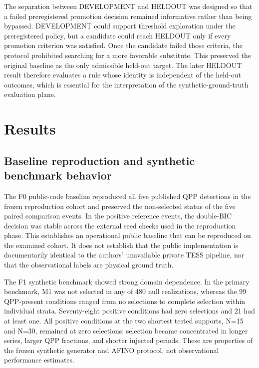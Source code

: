 \documentclass[11pt,a4paper]{article}
\begin{document}
The separation between DEVELOPMENT and HELDOUT was designed so that a failed preregistered promotion decision remained informative rather than being bypassed. DEVELOPMENT could support threshold exploration under the preregistered policy, but a candidate could reach HELDOUT only if every promotion criterion was satisfied. Once the candidate failed those criteria, the protocol prohibited searching for a more favorable substitute. This preserved the original baseline as the only admissible held-out target. The later HELDOUT result therefore evaluates a rule whose identity is independent of the held-out outcomes, which is essential for the interpretation of the synthetic-ground-truth evaluation plane.

\section{Results}
\subsection{Baseline reproduction and synthetic benchmark behavior}
The F0 public-code baseline reproduced all five published QPP detections in the frozen reproduction cohort and preserved the non-selected status of the five paired comparison events. In the positive reference events, the double-BIC decision was stable across the external seed checks used in the reproduction phase. This establishes an operational public baseline that can be reproduced on the examined cohort. It does not establish that the public implementation is documentarily identical to the authors' unavailable private TESS pipeline, nor that the observational labels are physical ground truth.

The F1 synthetic benchmark showed strong domain dependence. In the primary benchmark, M1 was not selected in any of 480 null realizations, whereas the 99 QPP-present conditions ranged from no selections to complete selection within individual strata. Seventy-eight positive conditions had zero selections and 21 had at least one. All positive conditions at the two shortest tested supports, N=15 and N=30, remained at zero selections; selection became concentrated in longer series, larger QPP fractions, and shorter injected periods. These are properties of the frozen synthetic generator and AFINO protocol, not observational performance estimates.
\end{document}
